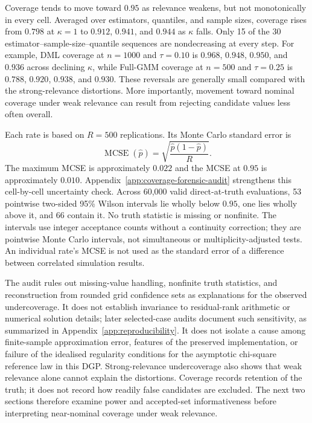 Coverage tends to move toward $0.95$ as relevance weakens, but not monotonically in every cell. Averaged over estimators, quantiles, and sample sizes, coverage rises from $0.798$ at $\kappa=1$ to $0.912$, $0.941$, and $0.944$ as $\kappa$ falls. Only 15 of the 30 estimator--sample-size--quantile sequences are nondecreasing at every step. For example, DML coverage at $n=1000$ and $\tau=0.10$ is $0.968$, $0.948$, $0.950$, and $0.936$ across declining $\kappa$, while Full-GMM coverage at $n=500$ and $\tau=0.25$ is $0.788$, $0.920$, $0.938$, and $0.930$. These reversals are generally small compared with the strong-relevance distortions. More importantly, movement toward nominal coverage under weak relevance can result from rejecting candidate values less often overall.

Each rate is based on $R=500$ replications. Its Monte Carlo standard error is
\[
\operatorname{MCSE}(\widehat p)
=
\sqrt{\frac{\widehat p(1-\widehat p)}{R}}.
\]
The maximum MCSE is approximately $0.022$ and the MCSE at $0.95$ is approximately $0.010$. Appendix~\ref{app:coverage-forensic-audit} strengthens this cell-by-cell uncertainty check. Across 60,000 valid direct-at-truth evaluations, 53 pointwise two-sided 95\% Wilson intervals lie wholly below $0.95$, one lies wholly above it, and 66 contain it. No truth statistic is missing or nonfinite. The intervals use integer acceptance counts without a continuity correction; they are pointwise Monte Carlo intervals, not simultaneous or multiplicity-adjusted tests. An individual rate's MCSE is not used as the standard error of a difference between correlated simulation results.

The audit rules out missing-value handling, nonfinite truth statistics, and reconstruction from rounded grid confidence sets as explanations for the observed undercoverage. It does not establish invariance to residual-rank arithmetic or numerical solution details; later selected-case audits document such sensitivity, as summarized in Appendix~\ref{app:reproducibility}. It does not isolate a cause among finite-sample approximation error, features of the preserved implementation, or failure of the idealised regularity conditions for the asymptotic chi-square reference law in this DGP. Strong-relevance undercoverage also shows that weak relevance alone cannot explain the distortions. Coverage records retention of the truth; it does not record how readily false candidates are excluded. The next two sections therefore examine power and accepted-set informativeness before interpreting near-nominal coverage under weak relevance.

